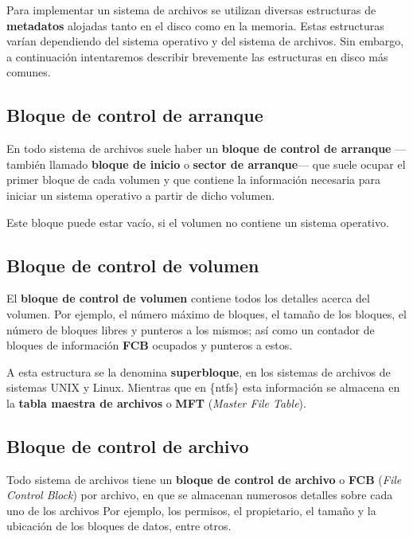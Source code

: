 Para implementar un sistema de archivos se utilizan diversas estructuras
de \textbf{metadatos} alojadas tanto en el disco como en la memoria.
Estas estructuras varían dependiendo del sistema operativo y del sistema
de archivos. Sin embargo, a continuación intentaremos describir
brevemente las estructuras en disco más comunes.

\subsection{Bloque de control de
arranque}\label{_bloque_de_control_de_arranque}

{} {} {} En todo sistema de archivos suele haber un \textbf{bloque de
control de arranque} ---también llamado \textbf{bloque de inicio} o
\textbf{sector de arranque}--- que suele ocupar el primer bloque de cada
volumen y que contiene la información necesaria para iniciar un sistema
operativo a partir de dicho volumen.

Este bloque puede estar vacío, si el volumen no contiene un sistema
operativo.

\subsection{Bloque de control de
volumen}\label{_bloque_de_control_de_volumen}

{} El \textbf{bloque de control de volumen} contiene todos los detalles
acerca del volumen. Por ejemplo, el número máximo de bloques, el tamaño
de los bloques, el número de bloques libres y punteros a los mismos; así
como un contador de bloques de información \textbf{FCB} ocupados y
punteros a estos.

A esta estructura se la denomina \textbf{{}superbloque}, en los sistemas
de archivos de sistemas UNIX y Linux. Mientras que en \{ntfs\} esta
información se almacena en la \textbf{tabla maestra de archivos} o
\textbf{{}MFT} (\emph{Master File Table}).

\subsection{Bloque de control de
archivo}\label{_bloque_de_control_de_archivo}

{} Todo sistema de archivos tiene un \textbf{bloque de control de
archivo} o \textbf{{}FCB} (\emph{File Control Block}) por archivo, en
que se almacenan numerosos detalles sobre cada uno de los archivos Por
ejemplo, los permisos, el propietario, el tamaño y la ubicación de los
bloques de datos, entre otros.

